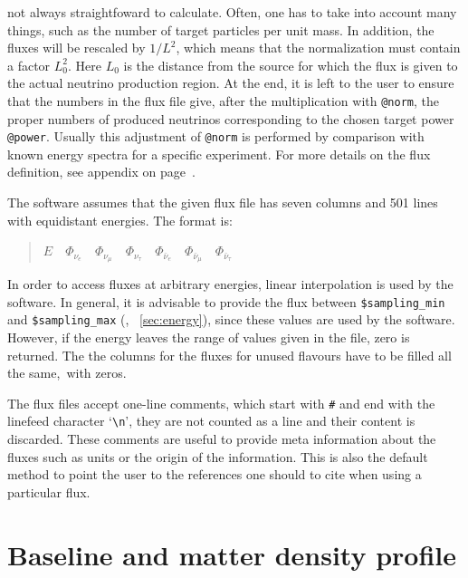 not always straightfoward to calculate. Often, one has to take into account
many things, such as the number of target particles per unit mass. 
In addition, the fluxes will be rescaled by $1/L^2$, which means that the
normalization must contain a factor $L_0^2$. Here $L_0$ is the distance from the source for which the flux is given to the actual neutrino production region. At the end, it is left to the user to ensure that the 
numbers in the flux file give, after the multiplication with {\tt @norm}, 
the proper numbers of produced neutrinos corresponding to the chosen target power {\tt @power}. Usually this adjustment of {\tt @norm} is performed by comparison with known energy spectra for a specific experiment.
For more details on the flux definition, see appendix on page~\pageref{app:flux}.

The software assumes that the given flux file has seven columns and
501 lines with equidistant energies. The format is:
\begin{quotation}
$ E\quad
\Phi_{\nu_e}\quad
\Phi_{\nu_\mu}\quad
\Phi_{\nu_\tau}\quad
\Phi_{\bar\nu_e}\quad
\Phi_{\bar\nu_\mu}\quad
\Phi_{\bar\nu_\tau}$
\end{quotation}
In order to access fluxes at arbitrary energies, linear interpolation 
is used by the software. In general, it is advisable to provide the flux between {\tt \$sampling\_min} and {\tt \$sampling\_max} (\cf, \Sec~\ref{sec:energy}), since these values are used by the software. However, if the energy leaves the range of values given in the file, zero is returned.
The the columns for the fluxes for unused flavours have to be filled all the 
same,\eg\ with zeros. 

The flux files accept one-line comments, which start
with {\tt \#} and end with the linefeed character `\verb+\n+', they are
not counted as a line and their content is discarded. These comments
are useful to provide meta information about the fluxes such as units
or the origin of the information. This is also the default method
to point the user to the references one should to cite when using
a particular flux.

\section{Baseline and matter density profile}

